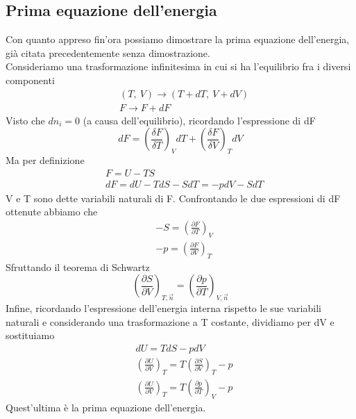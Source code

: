 \documentclass[10pt,a4paper]{article}
\begin{document}
\subsection{Prima equazione dell'energia}\label{sec:prima_eq_energia}
Con quanto appreso fin'ora possiamo dimostrare la prima equazione dell'energia, già citata precedentemente senza dimostrazione.\\
Consideriamo una trasformazione infinitesima in cui si ha l'equilibrio fra i diversi componenti 
\begin{align*}
	&(T,\ V)\rightarrow (T+dT,\ V + dV)\\
	&F \rightarrow F+dF
\end{align*}
Visto che \(dn_i = 0 \) (a causa dell'equilibrio), ricordando l'espressione di dF
\[dF = \left(\frac{\delta F}{\delta T}\right)_{ V} dT + \left(\frac{\delta F}{\delta V}\right)_{T} dV\] 
Ma per definizione 
\begin{align*}
	&F = U - TS\\
	&dF = dU - TdS - S dT = -pdV -SdT 
\end{align*}
V e T sono dette variabili naturali di F. Confrontando le due espressioni di dF ottenute abbiamo che
\begin{align*}
	&-S = \left(\frac{\partial F}{\partial T}\right)_V\\
	&-p =  \left(\frac{\partial F}{\partial V}\right)_T
\end{align*}
Sfruttando il teorema di Schwartz
\[\left(\frac{\partial S}{\partial V}\right)_{T,\vec{n}} =  \left(\frac{\partial p}{\partial T}\right)_{V,\vec{n}}\]
Infine, ricordando l'espressione dell'energia interna rispetto le sue variabili naturali e considerando una trasformazione a T costante, dividiamo per dV e sostituiamo
\begin{align*}
	&dU = TdS -pdV\\
	&\left(\frac{\partial U}{\partial V}\right)_T = T \left(\frac{\partial S}{\partial V}\right)_T -p\\
	&\left(\frac{\partial U}{\partial V}\right)_T = T \left(\frac{\partial p}{\partial T}\right)_V -p	
\end{align*}
Quest'ultima è la prima equazione dell'energia.
\end{document}
